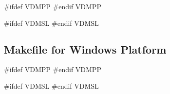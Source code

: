 \documentclass[\pformat,12pt]{article}
\begin{document}
#ifdef VDMPP
#endif VDMPP

#ifdef VDMSL
#endif VDMSL

\subsection{Makefile for Windows Platform}

#ifdef VDMPP
#endif VDMPP

#ifdef VDMSL
#endif VDMSL

%
%
%
\end{document}
